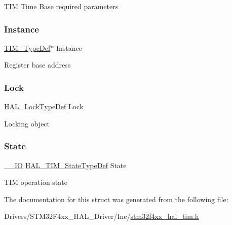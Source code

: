 T\+IM Time Base required parameters \mbox{\label{struct_t_i_m___handle_type_def_a4076faade36875a6a05767135bb70b86}} 
\subsubsection{\texorpdfstring{Instance}{Instance}}
{\footnotesize\ttfamily \mbox{\hyperlink{struct_t_i_m___type_def}{T\+I\+M\+\_\+\+Type\+Def}}$\ast$ Instance}

Register base address \mbox{\label{struct_t_i_m___handle_type_def_ad4cf225029dbefe8d3fe660c33b8bb6b}} 
\subsubsection{\texorpdfstring{Lock}{Lock}}
{\footnotesize\ttfamily \mbox{\hyperlink{stm32f4xx__hal__def_8h_ab367482e943333a1299294eadaad284b}{H\+A\+L\+\_\+\+Lock\+Type\+Def}} Lock}

Locking object \mbox{\label{struct_t_i_m___handle_type_def_ad4c7388b23a70d7a1a257d6c94df29f3}} 
\subsubsection{\texorpdfstring{State}{State}}
{\footnotesize\ttfamily \mbox{\hyperlink{core__sc300_8h_aec43007d9998a0a0e01faede4133d6be}{\+\_\+\+\_\+\+IO}} \mbox{\hyperlink{group___t_i_m___exported___types_gae0994cf5970e56ca4903e9151f40010c}{H\+A\+L\+\_\+\+T\+I\+M\+\_\+\+State\+Type\+Def}} State}

T\+IM operation state 

The documentation for this struct was generated from the following file\+:\begin{DoxyCompactItemize}
\item 
Drivers/\+S\+T\+M32\+F4xx\+\_\+\+H\+A\+L\+\_\+\+Driver/\+Inc/\mbox{\hyperlink{stm32f4xx__hal__tim_8h}{stm32f4xx\+\_\+hal\+\_\+tim.\+h}}\end{DoxyCompactItemize}
